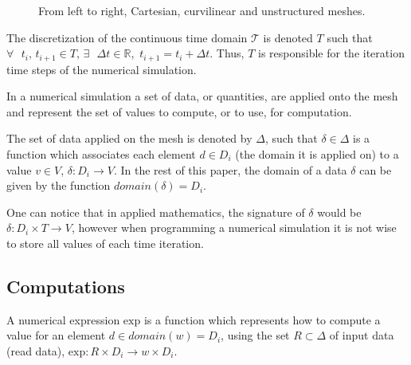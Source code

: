 \begin{figure}[!h]\begin{center}
  \caption{From left to right, Cartesian, curvilinear and unstructured meshes.}
  \label{fig:mesh}
\end{center}\end{figure}

\begin{mydef}
The discretization of the continuous time domain $\mathcal{T}$ is denoted $T$ such that $\forall\mbox{ }t_i\mbox{, }t_{i+1} \in T\mbox{, }\exists\mbox{ }\Delta t \in \mathbb{R}$\mbox{, }$t_{i+1} = t_i + \Delta t$. Thus, $T$ is responsible for the iteration time steps of the numerical simulation. 
\end{mydef}

In a numerical simulation a set of data, or quantities, are applied onto the mesh and represent the set of values to compute, or to use, for computation.

\begin{mydef}
The set of data applied on the mesh is denoted by $\Delta$, such that $\delta \in \Delta$ is a function which associates each element $d \in D_i$ (the domain it is applied on) to a value $v \in V$, $\delta : D_i \rightarrow V$. In the rest of this paper, the domain of a data $\delta$ can be given by the function $domain(\delta)=D_i$.
\end{mydef}
One can notice that in applied mathematics, the signature of $\delta$ would be $\delta : D_i \times T \rightarrow V$, however when programming a numerical simulation it is not wise to store all values of each time iteration.

\subsection{Computations}

\begin{mydef}
A numerical expression $\text{exp}$ is a function which represents how to compute a value for an element $d \in domain(w)=D_i$, using the set $R \subset \Delta$ of input data (read data), $\text{exp} : R \times D_i \rightarrow w \times D_i$.
\end{mydef}

